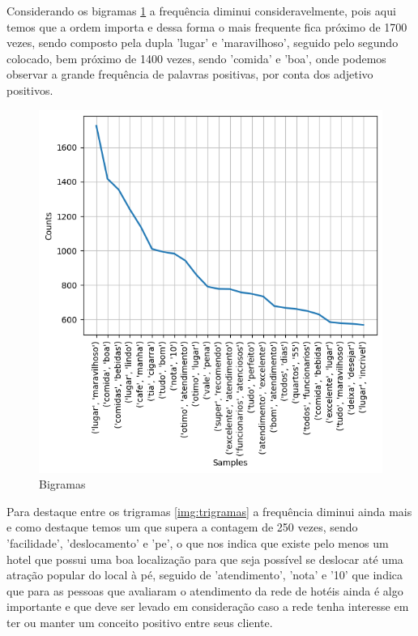 Considerando os bigramas \ref{img:bigramas} a frequência diminui consideravelmente, pois aqui temos que a ordem importa e dessa forma o mais frequente fica próximo de 1700 vezes, sendo composto pela dupla 'lugar' e 'maravilhoso', seguido pelo segundo colocado, bem próximo de 1400 vezes, sendo 'comida' e 'boa', onde podemos observar a grande frequência de palavras positivas, por conta dos adjetivo positivos.

\begin{figure}
	\centering
	\includegraphics[width=1\textwidth]{figs/exploratoria/bigramas.png}
	\caption{Bigramas}
	\label{img:bigramas}
\end{figure}

Para destaque entre os trigramas \ref{img:trigramas} a frequência diminui ainda mais e como destaque temos um que supera a contagem de 250 vezes, sendo 'facilidade', 'deslocamento' e 'pe', o que nos indica que existe pelo menos um hotel que possui uma boa localização para que seja possível se deslocar até uma atração popular do local à pé, seguido de 'atendimento', 'nota' e '10' que indica que para as pessoas que avaliaram o atendimento da rede de hotéis ainda é algo importante e que deve ser levado em consideração caso a rede tenha interesse em ter ou manter um conceito positivo entre seus cliente.

